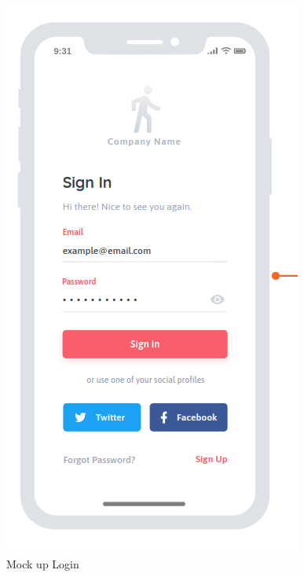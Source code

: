     \begin{figure}[h!]
        \includegraphics[width=\linewidth]{./graphics/login_Mockup.png}
        \caption{Mock up Login}
        \label{fig:loginMockup}
    \end{figure}

